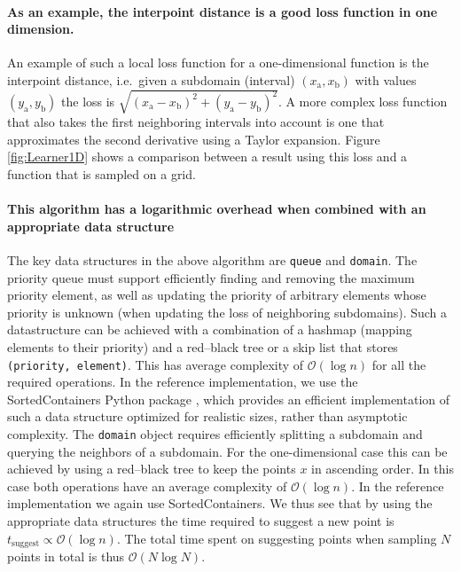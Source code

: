 \documentclass[english, twocolumn, 10pt, aps, superscriptaddress, floatfix, prb, citeautoscript]{revtex4-1}
\renewcommand{\citep}{\cite}
\newcommand{\passthrough}[1]{\lstset{mathescape=false}#1\lstset{mathescape=true}}
\begin{document}
\paragraph{As an example, the interpoint distance is a good loss function in one dimension.}

An example of such a local loss function for a one-dimensional function is the interpoint distance, i.e.~given a subdomain (interval) \((x_\textrm{a}, x_\textrm{b})\) with values \((y_\textrm{a}, y_\textrm{b})\) the loss is \(\sqrt{(x_\textrm{a} - x_\textrm{b})^2 + (y_\textrm{a} - y_\textrm{b})^2}\).
A more complex loss function that also takes the first neighboring intervals into account is one that approximates the second derivative using a Taylor expansion.
Figure \ref{fig:Learner1D} shows a comparison between a result using this loss and a function that is sampled on a grid.

\paragraph{This algorithm has a logarithmic overhead when combined with an appropriate data structure}

The key data structures in the above algorithm are \passthrough{\lstinline!queue!} and \passthrough{\lstinline!domain!}.
The priority queue must support efficiently finding and removing the maximum priority element, as well as updating the priority of arbitrary elements whose priority is unknown (when updating the loss of neighboring subdomains).
Such a datastructure can be achieved with a combination of a hashmap (mapping elements to their priority) and a red--black tree or a skip list \citep{Cormen2009} that stores \passthrough{\lstinline!(priority, element)!}.
This has average complexity of \(\mathcal{O}(\log{n})\) for all the required operations.
In the reference implementation, we use the SortedContainers Python package \citep{Jenks2014}, which provides an efficient implementation of such a data structure optimized for realistic sizes, rather than asymptotic complexity.
The \passthrough{\lstinline!domain!} object requires efficiently splitting a subdomain and querying the neighbors of a subdomain.
For the one-dimensional case this can be achieved by using a red--black tree to keep the points \(x\) in ascending order.
In this case both operations have an average complexity of \(\mathcal{O}(\log{n})\).
In the reference implementation we again use SortedContainers.
We thus see that by using the appropriate data structures the time required to suggest a new point is \(t_\textrm{suggest} \propto \mathcal{O}(\log{n})\).
The total time spent on suggesting points when sampling \(N\) points in total is thus \(\mathcal{O}(N \log{N})\).
\end{document}
